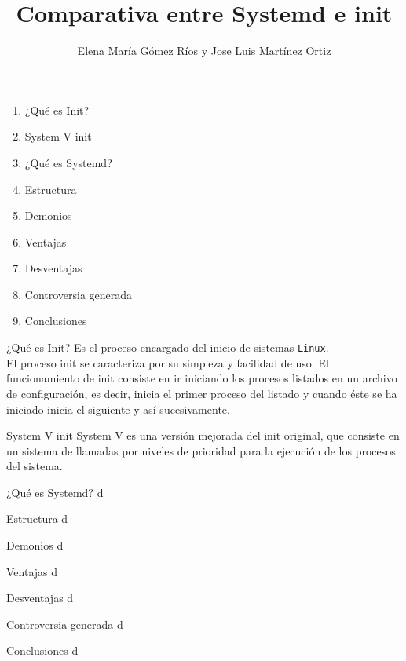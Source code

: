 \documentclass[11pt]{beamer}
\author{Elena María Gómez Ríos y Jose Luis Martínez Ortiz}
\title{Comparativa entre Systemd e init}
\begin{document}
\begin{frame}
\titlepage
\end{frame}

\begin{frame}
\begin{enumerate}
\item ¿Qué es Init?
\item System V init
\item ¿Qué es Systemd?
\item Estructura
\item Demonios
\item Ventajas
\item Desventajas
\item Controversia generada
\item Conclusiones
\end{enumerate}
\end{frame}


\begin{frame}{¿Qué es Init?} %
Es el proceso encargado del inicio de sistemas \texttt{Linux}.\\
\vspace{1cm}
El proceso init se caracteriza por su simpleza y facilidad de uso. El funcionamiento de init consiste en ir iniciando los procesos listados en un archivo de configuración, es decir, inicia el primer proceso del listado y cuando éste se ha iniciado inicia el siguiente y así sucesivamente.
\end{frame}
\begin{frame}{System V init} %
System V es una versión mejorada del init original, que consiste en un sistema de llamadas por niveles de prioridad para la ejecución de los procesos del sistema.
\end{frame}
\begin{frame}{¿Qué es Systemd?} %
d
\end{frame}
\begin{frame}{Estructura} %
d
\end{frame}
\begin{frame}{Demonios} %
d
\end{frame}
\begin{frame}{Ventajas} %
d
\end{frame}

\begin{frame}{Desventajas} %
d
\end{frame}

\begin{frame}{Controversia generada} %
d
\end{frame}
\begin{frame}{Conclusiones} %
d
\end{frame}
\end{document}
